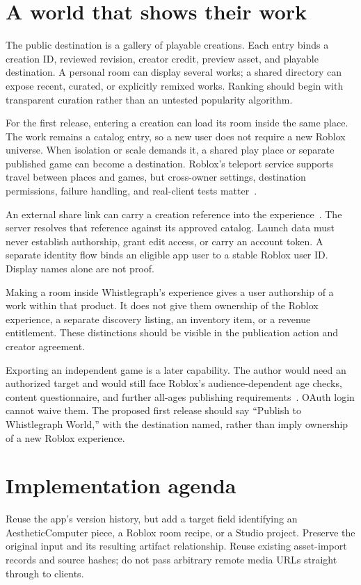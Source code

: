 \documentclass[10pt,letterpaper,twocolumn]{article}
\renewcommand{\ac}{Aesthetic\acdot Computer}
\begin{document}
\section{A world that shows their work}
The public destination is a gallery of playable creations. Each entry binds a creation ID, reviewed revision, creator credit, preview asset, and playable destination. A personal room can display several works; a shared directory can expose recent, curated, or explicitly remixed works. Ranking should begin with transparent curation rather than an untested popularity algorithm.

For the first release, entering a creation can load its room inside the same place. The work remains a catalog entry, so a new user does not require a new Roblox universe. When isolation or scale demands it, a shared play place or separate published game can become a destination. Roblox's teleport service supports travel between places and games, but cross-owner settings, destination permissions, failure handling, and real-client tests matter~\cite{teleport}.

An external share link can carry a creation reference into the experience~\cite{share}. The server resolves that reference against its approved catalog. Launch data must never establish authorship, grant edit access, or carry an account token. A separate identity flow binds an eligible app user to a stable Roblox user ID. Display names alone are not proof.

Making a room inside Whistlegraph's experience gives a user authorship of a work within that product. It does not give them ownership of the Roblox experience, a separate discovery listing, an inventory item, or a revenue entitlement. These distinctions should be visible in the publication action and creator agreement.

Exporting an independent game is a later capability. The author would need an authorized target and would still face Roblox's audience-dependent age checks, content questionnaire, and further all-ages publishing requirements~\cite{eligibility}. OAuth login cannot waive them. The proposed first release should say ``Publish to Whistlegraph World,'' with the destination named, rather than imply ownership of a new Roblox experience.

\section{Implementation agenda}
Reuse the app's version history, but add a target field identifying an \ac{} piece, a Roblox room recipe, or a Studio project. Preserve the original input and its resulting artifact relationship. Reuse existing asset-import records and source hashes; do not pass arbitrary remote media URLs straight through to clients.
\end{document}
